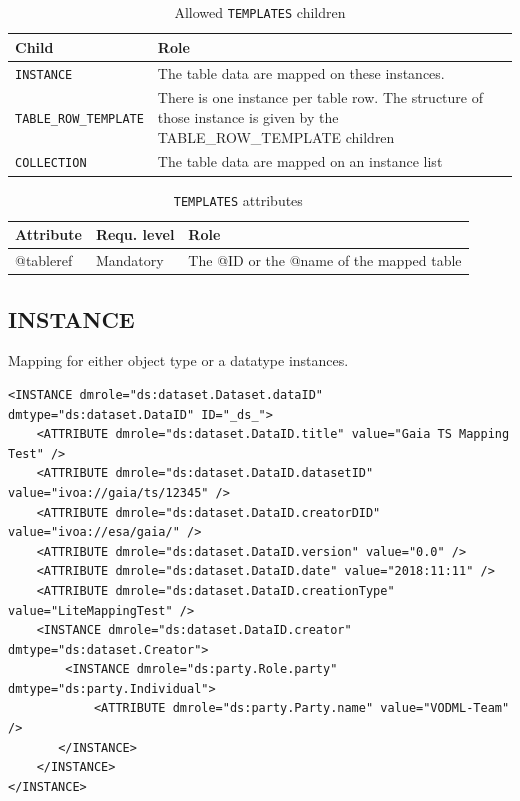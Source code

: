 \documentclass[11pt,a4paper]{ivoa}
\begin{document}
\begin{table}[ht!]
     \begin{tabular}{|p{3cm}|p{7cm}|}
       \hline Child &  Role\\
       \hline  \texttt{INSTANCE}    & The table data are mapped on these instances.  \\              
       \hline  \texttt{TABLE\_ROW\_TEMPLATE}    &  There is one instance per table row. The structure of those instance is given by the TABLE\_ROW\_TEMPLATE children \\              
       \hline  \texttt{COLLECTION}    &  The table data are mapped on an instance list\\       
       \hline 
     \end{tabular}
     \caption{Allowed  \texttt{TEMPLATES} children} 
 \end{table}


\begin{table}[ht!]
     \begin{tabular}{|p{1.5cm}|p{4cm}|p{7cm}|}
       \hline Attribute & Requ. level & Role\\
       \hline  @tableref  & Mandatory & The @ID or the @name of the mapped table  \\
       \hline 
     \end{tabular}
     \caption{\texttt{TEMPLATES} attributes} 
 \end{table}


\subsection{INSTANCE}

Mapping for either object type or a datatype instances.


\begin{lstlisting}[caption={INSTANCE bloc example},captionpos=b]
<INSTANCE dmrole="ds:dataset.Dataset.dataID" dmtype="ds:dataset.DataID" ID="_ds_">
    <ATTRIBUTE dmrole="ds:dataset.DataID.title" value="Gaia TS Mapping Test" />
    <ATTRIBUTE dmrole="ds:dataset.DataID.datasetID" value="ivoa://gaia/ts/12345" />
    <ATTRIBUTE dmrole="ds:dataset.DataID.creatorDID" value="ivoa://esa/gaia/" />
    <ATTRIBUTE dmrole="ds:dataset.DataID.version" value="0.0" />
    <ATTRIBUTE dmrole="ds:dataset.DataID.date" value="2018:11:11" />
    <ATTRIBUTE dmrole="ds:dataset.DataID.creationType" value="LiteMappingTest" />
    <INSTANCE dmrole="ds:dataset.DataID.creator" dmtype="ds:dataset.Creator">
        <INSTANCE dmrole="ds:party.Role.party" dmtype="ds:party.Individual">
            <ATTRIBUTE dmrole="ds:party.Party.name" value="VODML-Team" />
       </INSTANCE>
    </INSTANCE>
</INSTANCE>
\end{lstlisting}
\end{document}
